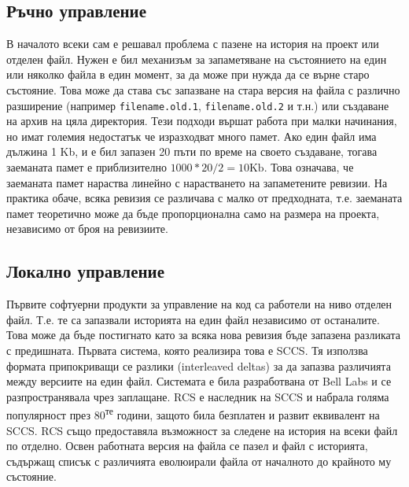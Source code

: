 \documentclass[a4paper]{article}
\begin{document}
  \subsection{Ръчно управление}
  В началото всеки сам е решавал проблема с пазене на история на проект или
  отделен файл. Нужен е бил механизъм за запаметяване на състоянието на един
  или няколко файла в един момент, за да може при нужда да се върне старо
  състояние. Това може да става със запазване на стара версия на файла с
  различно разширение (например \texttt{filename.old.1},
  \texttt{filename.old.2} и т.н.) или създаване на архив на цяла директория.
  Тези подходи вършат работа при малки начинания, но имат големия недостатък че
  изразходват много памет. Ако един файл има дължина 1 Kb, и е бил запазен 20
  пъти по време на своето създаване, тогава заеманата памет е приблизително
  $1000 * 20 / 2 = 10 \mathrm{Kb}$. Това означава, че заеманата памет нараства
  линейно с нарастването на запаметените ревизии. На практика обаче, всяка
  ревизия се различава с малко от предходната, т.е. заеманата памет теоретично
  може да бъде пропорционална само на размера на проекта, независимо от броя на
  ревизиите.

  \subsection{Локално управление}
  Първите софтуерни продукти за управление на код са работели на ниво отделен
  файл. Т.е. те са запазвали историята на един файл независимо от останалите.
  Това може да бъде постигнато като за всяка нова ревизия бъде запазена
  разликата с предишната. Първата система, която реализира това е
  SCCS\cite{sccs}. Тя използва формата припокриващи се разлики (interleaved
  deltas) за да запазва различията между версиите на един файл. Системата е
  била разработвана от Bell Labs и се разпространявала чрез заплащане.
  RCS\cite{rcs} е наследник на SCCS и набрала голяма популярност през
  80\textsuperscript{те} години, защото била безплатен и развит еквивалент на
  SCCS. RCS също предоставяла възможност за следене на история на всеки файл по
  отделно. Освен работната версия на файла се пазел и файл с историята,
  съдържащ списък с различията еволюирали файла от началното до крайното му
  състояние.
\end{document}
